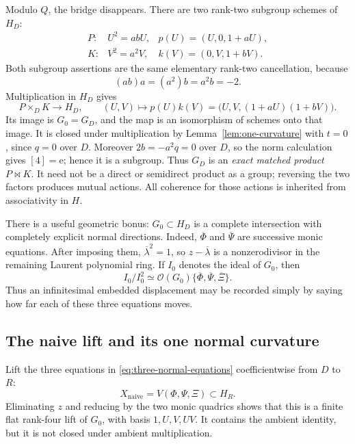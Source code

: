 \documentclass[11pt]{amsart}
\theoremstyle{definition}
\theoremstyle{remark}
\newcommand{\unit}{\mathrm e}
\begin{document}
Modulo \(Q\), the bridge disappears.  There are two rank-two subgroup
schemes of \(H_D\):
\begin{equation}\label{eq:two-downstairs-factors}
 \begin{array}{lll}
  P:&U^2=abU,&p(U)=(U,0,1+aU),\\[2pt]
  K:&V^2=a^2V,&k(V)=(0,V,1+bV).
 \end{array}
\end{equation}
Both subgroup assertions are the same elementary rank-two cancellation,
because
\[
 (ab)a=(a^2)b=a^2b=-2.
\]
Multiplication in \(H_D\) gives
\begin{equation}\label{eq:matched-product-map}
 P\times_DK\longrightarrow H_D,
 \qquad
 (U,V)\longmapsto p(U)k(V)
   =\bigl(U,V,(1+aU)(1+bV)\bigr).
\end{equation}
Its image is \(G_0=G_D\), and the map is an isomorphism of schemes onto
that image.  It is closed under multiplication by
Lemma~\ref{lem:one-curvature} with \(t=0\), since \(q=0\) over \(D\).
Moreover \(2b=-a^2q=0\) over \(D\), so the norm calculation gives
\([4]=\unit\); hence it is a subgroup.  Thus \(G_D\) is an \emph{exact
matched product} \(P\bowtie K\).  It need not be a direct or semidirect
product as a group; reversing the two factors produces mutual actions.
All coherence for those actions is inherited from associativity in \(H\).

There is a useful geometric bonus: \(G_0\subset H_D\) is a complete
intersection with completely explicit normal directions.  Indeed,
\(\overline\Phi\) and \(\overline\Psi\) are successive monic equations.
After imposing them, \(\overline\lambda^2=1\), so
\(z-\overline\lambda\) is a nonzerodivisor in the remaining Laurent
polynomial ring.  If \(I_0\) denotes the ideal of \(G_0\), then
\begin{equation}\label{eq:conormal-basis}
 I_0/I_0^2\simeq
 \mathcal O(G_0)\{\overline\Phi,\overline\Psi,\overline\Xi\}.
\end{equation}
Thus an infinitesimal embedded displacement may be recorded simply by
saying how far each of these three equations moves.

\subsection{The naive lift and its one normal curvature}

Lift the three equations in \eqref{eq:three-normal-equations}
coefficientwise from \(D\) to \(R\):
\begin{equation}\label{eq:naive-embedded-lift}
 X_{\mathrm{naive}}=V(\Phi,\Psi,\Xi)\subset H_R.
\end{equation}
Eliminating \(z\) and reducing by the two monic quadrics shows that this
is a finite flat rank-four lift of \(G_0\), with basis
\(1,U,V,UV\).  It contains the ambient identity, but it is not closed
under ambient multiplication.
\end{document}
